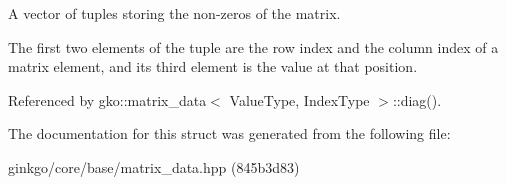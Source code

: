 A vector of tuples storing the non-\/zeros of the matrix. 

The first two elements of the tuple are the row index and the column index of a matrix element, and its third element is the value at that position. 

Referenced by gko\+::matrix\+\_\+data$<$ Value\+Type, Index\+Type $>$\+::diag().



The documentation for this struct was generated from the following file\+:\begin{DoxyCompactItemize}
\item 
ginkgo/core/base/matrix\+\_\+data.\+hpp (845b3d83)\end{DoxyCompactItemize}
